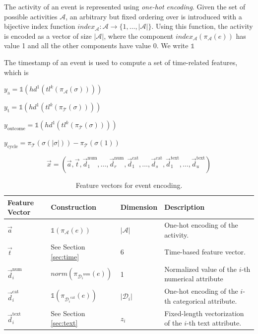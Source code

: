 The activity of an event is represented using \textit{one-hot encoding}.
Given the set of possible activities $\mathcal{A}$, an arbitrary but fixed ordering over is introduced with a bijective index function $index_\mathcal{A} \colon \mathcal{A} \to \{1, \dots, |\mathcal{A}|\}$.
Using this function, the activity is encoded as a vector of size $|\mathcal{A}|$, where the component $index_\mathcal{A}(\pi_\mathcal{A}(e))$ has value 1 and all the other components have value 0.
We write $\mathds{1}$

The timestamp of an event is used to compute a set of time-related features, which is 

$y_\mathrm{a} = \mathds{1}(hd^1(tl^k(\pi_\mathcal{A}(\sigma))))$

$y_\mathrm{t} = \mathds{1}(hd^1(tl^k(\pi_\mathcal{T}(\sigma))))$

$y_\mathrm{outcome} = \mathds{1}(hd^1(tl^k(\pi_\mathcal{T}(\sigma))))$

$y_\mathrm{cycle} =  \pi_\mathcal{T}(\sigma(|\sigma|))-  \pi_\mathcal{T}(\sigma(1))$

\begin{equation}
	\vec{x}=(
	\vec{a},
	\vec{t},
	\vec{d}_1^\mathrm{num}, \dots,\vec{d}_r^\mathrm{num},
	\vec{d}_1^\mathrm{cat}, \dots,\vec{d}_s^\mathrm{cat},
	\vec{d}_1^\mathrm{text}, \dots, \vec{d}_u^\mathrm{text})
\end{equation}


\begin{table}[!htbp]
\renewcommand{\arraystretch}{1.2}
\begin{tabularx}{\textwidth}{p{2cm} l l p{6.8cm} }
	\toprule
	 \textbf{Feature} \newline \textbf{Vector} & \textbf{Construction} &\textbf{Dimension} &  \textbf{Description} \\
	 \midrule
	 	$\vec{a}$ &$\mathds{1}(\pi_\mathcal{A}(e))$& $|\mathcal{A}|$& One-hot encoding of the activity. \\
	 	$\vec{t}$ & See Section \ref{sec:time} &6 & Time-based feature vector.\\
	 	$\vec{d}_i^\mathrm{num}$ &  $norm(\pi_{{\mathcal{D}_i}^\mathrm{num}}(e)) $ &1 & Normalized value of the $i$-th numerical attribute\\
	 	$\vec{d}_i^\mathrm{cat}$ & $\mathds{1}(\pi_{{\mathcal{D}_i}^\mathrm{cat}}(e))$&$|\mathcal{D}_i|$ & One-hot encoding of the $i$-th categorical attribute.\\
	 	$\vec{d}_i^\mathrm{text}$ & See Section \ref{sec:text} & $z_i$& Fixed-length vectorization of the $i$-th text attribute.\\
	\bottomrule
\end{tabularx}
	\caption{Feature vectors for event encoding.}
	\label{tab:features}
\end{table}

